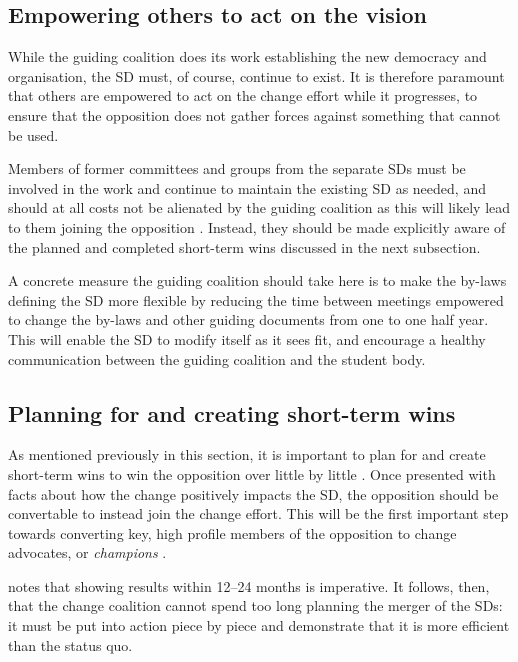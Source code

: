 \subsection{Empowering others to act on the vision}

While the guiding coalition does its work establishing the new democracy and organisation, the SD must, of course, continue to exist. It is therefore paramount that others are empowered to act on the change effort while it progresses, to ensure that the opposition does not gather forces against something that cannot be used.

Members of former committees and groups from the separate SDs must be involved in the work and continue to maintain the existing SD as needed, and should at all costs not be alienated by the guiding coalition as this will likely lead to them joining the opposition \autocite{kotter:leading-change-why-transformation-efforts-fail:1995}. Instead, they should be made explicitly aware of the planned and completed short-term wins discussed in the next subsection.

A concrete measure the guiding coalition should take here is to make the by-laws defining the SD more flexible by reducing the time between meetings empowered to change the by-laws and other guiding documents from one to one half year. This will enable the SD to modify itself as it sees fit, and encourage a healthy communication between the guiding coalition and the student body.

\subsection{Planning for and creating short-term wins}

As mentioned previously in this section, it is important to plan for and create short-term wins to win the opposition over little by little \autocite{kotter:leading-change-why-transformation-efforts-fail:1995}. Once presented with facts about how the change positively impacts the SD, the opposition should be convertable to instead join the change effort. This will be the first important step towards converting key, high profile members of the opposition to change advocates, or \textit{champions} \autocite{luftman:managing-the-information-technology-resource:2009}.

\citeauthor{kotter:leading-change-why-transformation-efforts-fail:1995} notes that showing results within 12--24 months is imperative. It follows, then, that the change coalition cannot spend too long planning the merger of the SDs: it must be put into action piece by piece and demonstrate that it is more efficient than the status quo.

